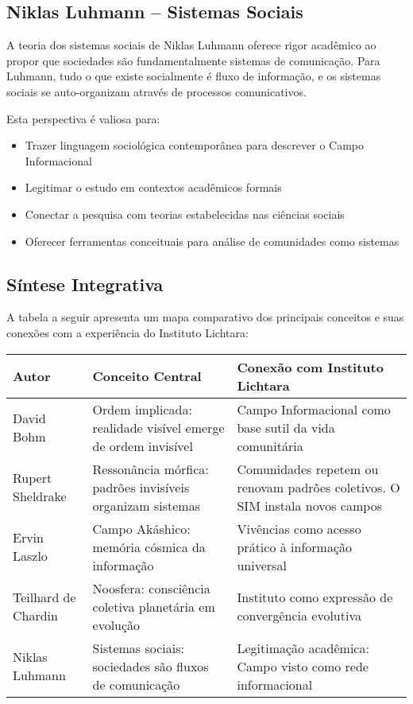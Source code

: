 \subsection{Niklas Luhmann – Sistemas Sociais}

A teoria dos sistemas sociais de Niklas Luhmann \cite{luhmann1995social} oferece rigor acadêmico ao propor que sociedades são fundamentalmente sistemas de comunicação. Para Luhmann, tudo o que existe socialmente é fluxo de informação, e os sistemas sociais se auto-organizam através de processos comunicativos.

Esta perspectiva é valiosa para:
\begin{itemize}
    \item Trazer linguagem sociológica contemporânea para descrever o Campo Informacional
    \item Legitimar o estudo em contextos acadêmicos formais
    \item Conectar a pesquisa com teorias estabelecidas nas ciências sociais
    \item Oferecer ferramentas conceituais para análise de comunidades como sistemas
\end{itemize}

\subsection{Síntese Integrativa}

A tabela a seguir apresenta um mapa comparativo dos principais conceitos e suas conexões com a experiência do Instituto Lichtara:

\begin{longtable}{|p{3cm}|p{4cm}|p{6cm}|}
\hline
\textbf{Autor} & \textbf{Conceito Central} & \textbf{Conexão com Instituto Lichtara} \\
\hline
\endhead
David Bohm & Ordem implicada: realidade visível emerge de ordem invisível & Campo Informacional como base sutil da vida comunitária \\
\hline
Rupert Sheldrake & Ressonância mórfica: padrões invisíveis organizam sistemas & Comunidades repetem ou renovam padrões coletivos. O SIM instala novos campos \\
\hline
Ervin Laszlo & Campo Akáshico: memória cósmica da informação & Vivências como acesso prático à informação universal \\
\hline
Teilhard de Chardin & Noosfera: consciência coletiva planetária em evolução & Instituto como expressão de convergência evolutiva \\
\hline
Niklas Luhmann & Sistemas sociais: sociedades são fluxos de comunicação & Legitimação acadêmica: Campo visto como rede informacional \\
\hline
\end{longtable}

